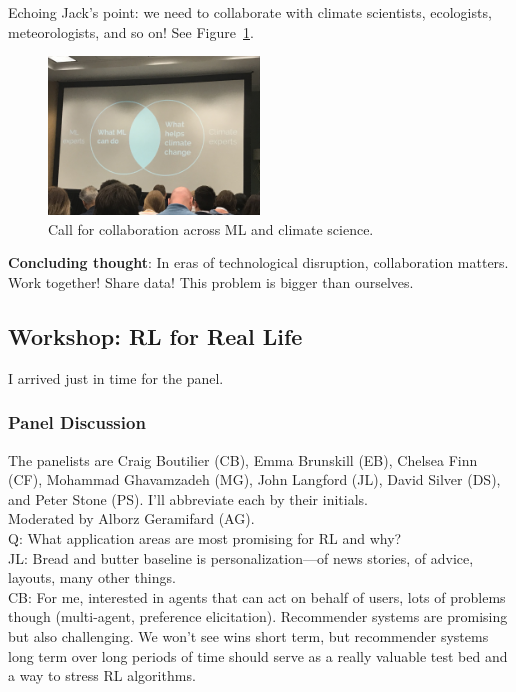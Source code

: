 Echoing Jack's point: we need to collaborate with climate scientists, ecologists, meteorologists, and so on! See Figure~\ref{fig:venn}.

\begin{figure}
    \centering
    \includegraphics[width=0.5\textwidth]{images/venn.JPG}
    \caption{Call for collaboration across ML and climate science.}
    \label{fig:venn}
\end{figure}


{\bf Concluding thought}: In eras of technological disruption, collaboration matters. Work together! Share data! This problem is bigger than ourselves.

\spacerule

\subsection{Workshop: RL for Real Life}

I arrived just in time for the panel.

\subsubsection{Panel Discussion}
\label{sec:panel}

The panelists are Craig Boutilier (CB), Emma Brunskill (EB), Chelsea Finn (CF), Mohammad Ghavamzadeh (MG), John Langford (JL), David Silver (DS), and Peter Stone (PS). I'll abbreviate each by their initials. \\

Moderated by Alborz Geramifard (AG). \\

Q: What application areas are most promising for RL and why? \\

JL: Bread and butter baseline is personalization---of news stories, of advice, layouts, many other things. \\

CB: For me, interested in agents that can act on behalf of users, lots of problems though (multi-agent, preference elicitation). Recommender systems are promising but also challenging. We won't see wins short term, but recommender systems long term over long periods of time should serve as a really valuable test bed and a way to stress RL algorithms. \\


